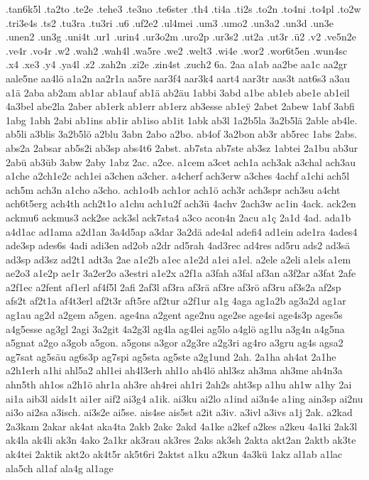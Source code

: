 {.tan6k5l
.ta2to
.te2e
.tehe3
.te3no
.te6ster
.th4
.ti4a
.ti2s
.to2n
.to4ni
.to4pl
.to2w
.tri3e4s
.ts2
.tu3ra
.tu3ri
.u6
.uf2e2
.ul4mei
.um3
.umo2
.un3a2
.un3d
.un3e
.unen2
.un3g
.uni4t
.ur1
.urin4
.ur3o2m
.uro2p
.ur3s2
.ut2a
.ut3r
.ü2
.v2
.ve5n2e
.ve4r
.vo4r
.w2
.wah2
.wah4l
.wa5re
.we2
.welt3
.wi4e
.wor2
.wor6t5en
.wun4sc
.x4
.xe3
.y4
.ya4l
.z2
.zah2n
.zi2e
.zin4st
.zuch2
6a.
2aa
a1ab
aa2be
aa1c
aa2gr
aale5ne
aa4lö
a1a2n
aa2r1a
aa5re
aar3f4
aar3k4
aart4
aar3tr
aas3t
aat6s3
a3au
a1ä
2aba
ab2am
ab1ar
ab1auf
ab1ä
ab2äu
1abbi
3abd
a1be
ab1eb
abe1e
ab1eil
4a3bel
abe2la
2aber
ab1erk
ab1err
ab1erz
ab3esse
ab1e^^ff
2abet
2abew
1abf
3abfi
1abg
1abh
2abi
ab1ins
ab1ir
ab1iso
ab1it
1abk
ab3l
1a2b5la
3a2b5lä
2able
ab4le.
ab5li
a3blis
3a2b5lö
a2blu
3abn
2abo
a2bo.
ab4of
3a2bon
ab3r
ab5rec
1abs
2abs.
abs2a
2absar
ab5s2i
ab3sp
abs4t6
2abst.
ab7sta
ab7ste
ab3sz
1abtei
2a1bu
ab3ur
2abü
ab3üb
3abw
2aby
1abz
2ac.
a2ce.
a1cem
a3cet
ach1a
ach3ak
a3chal
ach3au
a1che
a2ch1e2c
ach1ei
a3chen
a3cher.
a4cherf
ach3erw
a3ches
4achf
a1chi
ach5l
ach5m
ach3n
a1cho
a3cho.
ach1o4b
ach1or
ach1ö
ach3r
ach3spr
ach3su
a4cht
ach6t5erg
ach4th
ach2t1o
a1chu
ach1u2f
ach3ü
4achv
2ach3w
ac1in
4ack.
ack2en
ackmu6
ackmus3
ack2se
ack3sl
ack7sta4
a3co
acon4n
2acu
a1ç
2a1d
4ad.
ada1b
a4d1ac
ad1ama
a2d1an
3a4d5ap
a3dar
3a2dä
ade4al
adefi4
ad1ein
ade1ra
4ades4
ade3sp
ades6s
4adi
adi3en
ad2ob
a2dr
ad5rah
4ad3rec
ad4res
ad5ru
ads2
ad3sä
ad3sp
ad3sz
ad2t1
adt3a
2ae
a1e2b
a1ec
a1e2d
a1ei
a1el.
a2ele
a2eli
a1els
a1em
ae2o3
a1e2p
ae1r
3a2er2o
a3estri
a1e2x
a2f1a
a3fah
a3fal
af3an
a3f2ar
a3fat
2afe
a2f1ec
a2fent
af1erl
af4f5l
2afi
2af3l
af3ra
af3rä
af3re
af3rö
af3ru
af3s2a
af2sp
afs2t
af2t1a
af4t3erl
af2t3r
aft5re
af2tur
a2f1ur
a1g
4aga
ag1a2b
ag3a2d
ag1ar
ag1au
ag2d
a2gem
a5gen.
age4na
a2gent
age2nu
age2se
age4si
age4s3p
ages5s
a4g5esse
ag3gl
2agi
3a2git
4a2g3l
ag4la
ag4lei
ag5lo
a4glö
ag1lu
a3g4n
a4g5na
a5gnat
a2go
a3gob
a5gon.
a5gons
a3gor
a2g3re
a2g3ri
ag4ro
a3gru
ag4s
agsa2
ag7sat
ag5säu
ag6s3p
ag7spi
ag5sta
ag5ste
a2g1und
2ah.
2a1ha
ah4at
2a1he
a2h1erh
a1hi
ahl5a2
ahl1ei
ah4l3erh
ahl1o
ah4lö
ahl3sz
ah3ma
ah3me
ah4n3a
ahn5th
ah1os
a2h1ö
ahr1a
ah3re
ah4rei
ah1ri
2ah2s
aht3sp
a1hu
ah1w
a1hy
2ai
ai1a
aib3l
aids1t
ai1er
aif2
ai3g4
a1ik.
ai3ku
ai2lo
a1ind
ai3n4e
a1ing
ain3sp
ai2nu
ai3o
ai2sa
a3isch.
ai3s2e
ai5se.
ais4se
ais5st
a2it
a3iv.
a3ivl
a3ivs
a1j
2ak.
a2kad
2a3kam
2akar
ak4at
aka4ta
2akb
2akc
2akd
4a1ke
a2kef
a2kes
a2keu
4a1ki
2ak3l
ak4la
ak4li
ak3n
4ako
2a1kr
ak3rau
ak3res
2aks
ak3sh
2akta
akt2an
2aktb
ak3te
ak4tei
2aktik
akt2o
ak4t5r
ak5t6ri
2aktst
a1ku
a2kun
4a3kü
1akz
al1ab
a1lac
ala5ch
al1af
ala4g
al1age
}
